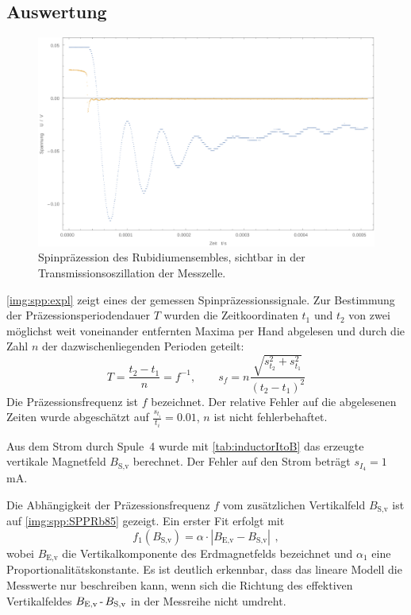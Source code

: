 \subsection{Auswertung}
\begin{figure}[H]
\begin{center}
  \includegraphics[width=\textwidth]{../img/part4/dummyExampleSpinpr.pdf}
  \caption{Spinpräzession des Rubidiumensembles, sichtbar in der Transmissionsoszillation der Messzelle.}
  \label{img:spp:expl}
\end{center}
\end{figure} 

\autoref{img:spp:expl} zeigt eines der gemessen Spinpräzessionssignale.
Zur Bestimmung der Präzessionsperiodendauer $T$ wurden die Zeitkoordinaten $t_1$ und $t_2$
von zwei möglichst weit voneinander entfernten Maxima per Hand abgelesen und durch
die Zahl $n$ der dazwischenliegenden Perioden geteilt:
\begin{equation}
  T=\frac{t_2-t_1}{n}=f^{-1}, \qquad s_f = n \frac{\sqrt{s_{t_2}^2 + s_{t_1}^2}}{ \left( t_2 -t_1 \right)^2 }
\end{equation}
Die Präzessionsfrequenz ist $f$ bezeichnet.
Der relative Fehler auf die abgelesenen Zeiten wurde abgeschätzt auf $\frac{s_{t_i}}{t_i}=0.01$,
$n$ ist nicht fehlerbehaftet.

Aus dem Strom durch Spule~4 wurde mit \autoref{tab:inductorItoB} das erzeugte vertikale Magnetfeld
$B_\text{S,v}$ berechnet. Der Fehler auf den Strom beträgt $s_{I_4}=1$\,mA.

Die Abhängigkeit der Präzessionsfrequenz $f$ vom zusätzlichen Vertikalfeld $B_\text{S,v}$ ist auf
\autoref{img:spp:SPPRb85} gezeigt.
Ein erster Fit erfolgt mit
\begin{equation}
  f_1(B_\text{S,v})=\alpha \cdot |B_\text{E,v}-B_\text{S,v}| \ \, ,
\end{equation}
wobei $B_\text{E,v}$ die Vertikalkomponente des Erdmagnetfelds bezeichnet und
$\alpha_1$ eine Proportionalitätskonstante.
Es ist deutlich erkennbar, dass das lineare Modell die Messwerte nur beschreiben kann,
wenn sich die Richtung des effektiven Vertikalfeldes
$B_\text{E,v} \text{\,-\,} B_\text{S,v}$ in der Messreihe nicht umdreht.

